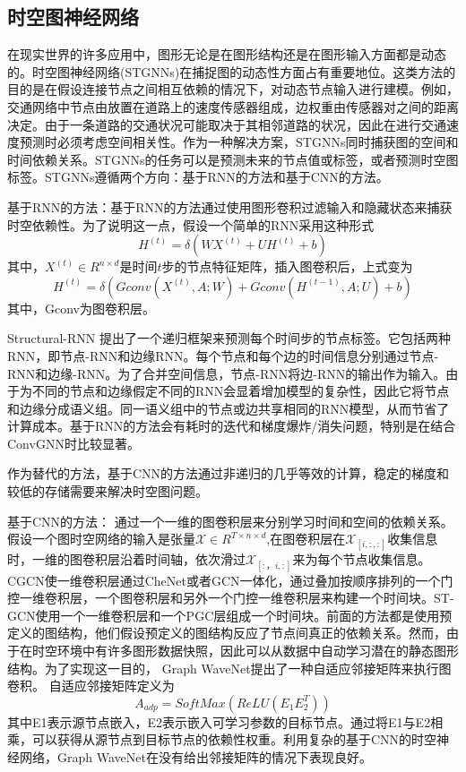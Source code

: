 \subsection{时空图神经网络}
在现实世界的许多应用中，图形无论是在图形结构还是在图形输入方面都是动态的。时空图神经网络(STGNNs)在捕捉图的动态性方面占有重要地位。这类方法的目的是在假设连接节点之间相互依赖的情况下，对动态节点输入进行建模。例如，交通网络中节点由放置在道路上的速度传感器组成，边权重由传感器对之间的距离决定。由于一条道路的交通状况可能取决于其相邻道路的状况，因此在进行交通速度预测时必须考虑空间相关性。作为一种解决方案，STGNNs同时捕获图的空间和时间依赖关系。STGNNs的任务可以是预测未来的节点值或标签，或者预测时空图标签。STGNNs遵循两个方向：基于RNN的方法和基于CNN的方法。

基于RNN的方法：基于RNN的方法通过使用图形卷积过滤输入和隐藏状态来捕获时空依赖性。为了说明这一点，假设一个简单的RNN采用这种形式
\[
H^{(t)}=\delta(WX^{(t)}+UH^{(t)}+b)
\]
其中，$X^{(t)}\in R^{n\times d}$是时间$t$步的节点特征矩阵，插入图卷积后，上式变为
\[
H^{(t)}=\delta(Gconv(X^{(t)},A;W)+Gconv(H^{(t-1)},A;U)+b)
\]
其中，Gconv为图卷积层。

Structural-RNN \cite{jain2016structural}提出了一个递归框架来预测每个时间步的节点标签。它包括两种RNN，即节点-RNN和边缘RNN。每个节点和每个边的时间信息分别通过节点-RNN和边缘-RNN。为了合并空间信息，节点-RNN将边-RNN的输出作为输入。由于为不同的节点和边缘假定不同的RNN会显着增加模型的复杂性，因此它将节点和边缘分成语义组。同一语义组中的节点或边共享相同的RNN模型，从而节省了计算成本。基于RNN的方法会有耗时的迭代和梯度爆炸/消失问题，特别是在结合ConvGNN时比较显著。

作为替代的方法，基于CNN的方法通过非递归的几乎等效的计算，稳定的梯度和较低的存储需要来解决时空图问题。

基于CNN的方法：
通过一个一维的图卷积层来分别学习时间和空间的依赖关系。假设一个图时空网络的输入是张量$\mathcal{X}\in R^{T \times n \times d}$,在图卷积层在$\mathcal{X}_{[i,:,:]}$收集信息时，一维的图卷积层沿着时间轴，依次滑过$\mathcal{X}_{[:，i,:]}$来为每个节点收集信息。CGCN\cite{yu2017spatio}使一维卷积层通过CheNet或者GCN一体化，通过叠加按顺序排列的一个门控一维卷积层，一个图卷积层和另外一个门控一维卷积层来构建一个时间块。ST-GCN\cite{yan2018spatial}使用一个一维卷积层和一个PGC层组成一个时间块。前面的方法都是使用预定义的图结构，他们假设预定义的图结构反应了节点间真正的依赖关系。然而，由于在时空环境中有许多图形数据快照，因此可以从数据中自动学习潜在的静态图形结构。为了实现这一目的，
Graph WaveNet\cite{wu2019graph}提出了一种自适应邻接矩阵来执行图卷积。
自适应邻接矩阵定义为
\[
A_{adp}=SoftMax(ReLU(E_1E_2^T))
\]
其中E1表示源节点嵌入，E2表示嵌入可学习参数的目标节点。通过将E1与E2相乘，可以获得从源节点到目标节点的依赖性权重。利用复杂的基于CNN的时空神经网络，Graph WaveNet在没有给出邻接矩阵的情况下表现良好。

